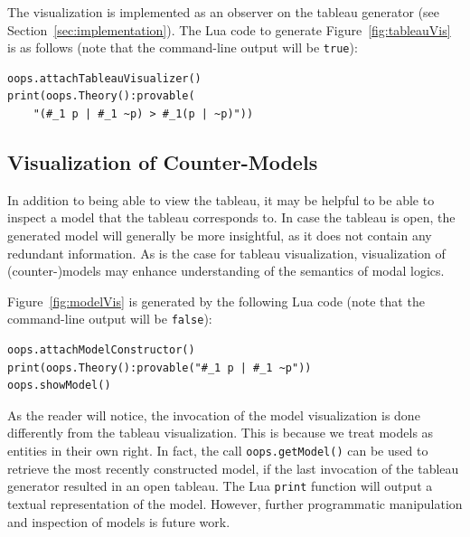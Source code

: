 The visualization is implemented as an observer on the tableau generator
(see Section~\ref{sec:implementation}).
The Lua code to generate
Figure~\ref{fig:tableauVis} is as follows (note that the command-line output
will be \lstinline!true!):
\begin{lstlisting}
oops.attachTableauVisualizer()
print(oops.Theory():provable(
	"(#_1 p | #_1 ~p) > #_1(p | ~p)"))
\end{lstlisting}

\subsection{Visualization of Counter-Models}

In addition to being able to view the tableau, it may be helpful to be able to
inspect a model that the tableau corresponds to.
In case the tableau is open, the generated model will generally be more
insightful, as it does not contain any redundant information.
As is the case for tableau visualization, visualization of (counter-)models may
enhance understanding of the semantics of modal logics.



Figure~\ref{fig:modelVis} is generated by the following Lua code (note that
the command-line output will be \lstinline!false!):
\begin{lstlisting}
oops.attachModelConstructor()
print(oops.Theory():provable("#_1 p | #_1 ~p"))
oops.showModel() 
\end{lstlisting}
As the reader will notice, the invocation of the model visualization is done
differently from the tableau visualization.
This is because we treat models as entities in their own right.
In fact, the call \lstinline!oops.getModel()!  can be used to retrieve the most
recently constructed model, if the last invocation of the tableau generator
resulted in an open tableau.
The Lua \lstinline!print! function will output a textual representation of the
model.
However, further programmatic manipulation and inspection of models is future
work.
